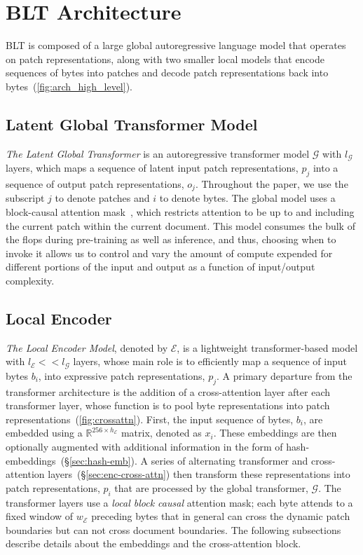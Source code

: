 \section{{\textsc BLT} Architecture}
\label{section:architecture}
{\textsc BLT} is composed of a large global autoregressive language model that operates on patch representations, along with two smaller local models that encode sequences of bytes into patches and decode patch representations back into bytes~(\autoref{fig:arch_high_level}). 

\subsection{Latent Global Transformer Model}

\textit{The Latent Global Transformer} is an autoregressive transformer model $\mathcal{G}$ with $l_{\mathcal{G}}$ layers, which maps a sequence of latent input patch representations, $p_j$ into a sequence of output patch representations, $o_j$. Throughout the paper, we use the subscript $j$ to denote patches and $i$ to denote bytes. The global model uses a block-causal attention mask~\citep{dubey2024llama}, which restricts attention to be up to and including the current patch  within the current document. This model consumes the bulk of the flops during pre-training as well as inference, and thus, choosing when to invoke it allows us to control and vary the amount of compute expended for different portions of the input and output as a function of input/output complexity.

\subsection{Local Encoder}
\label{section:local}

\textit{The Local Encoder Model}, denoted by $\mathcal{E}$, is a lightweight transformer-based model with $l_{\mathcal{E}} << l_{\mathcal{G}}$ layers, whose main role is to efficiently map a sequence of input bytes $b_i$, into expressive patch representations, $p_j$. A primary departure from the transformer architecture is the addition of a cross-attention layer after each transformer layer, whose function is to pool byte representations into patch representations~(\autoref{fig:crossattn}).
First, the input sequence of bytes, $b_i$, are embedded using a $\mathbb{R}^{256 \times h_{\mathcal{E}}}$ matrix, denoted as $x_i$. These embeddings are then optionally augmented with additional information in the form of hash-embeddings~(\S\ref{sec:hash-emb}).
A series of alternating transformer and cross-attention layers~(\S\ref{sec:enc-cross-attn}) then transform these representations into patch representations, $p_i$ that are processed by the global transformer, $\mathcal{G}$.
The transformer layers use a \textit{local block causal} attention mask; each byte attends to a fixed window of $w_{\mathcal{E}}$ preceding bytes that in general can cross the dynamic patch boundaries but can not cross document boundaries. The following subsections describe details about the embeddings and the cross-attention block.

